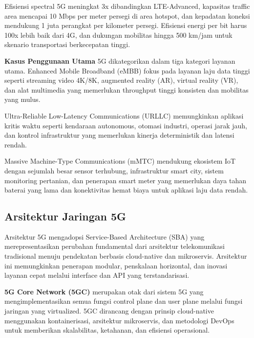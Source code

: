 Efisiensi spectral 5G meningkat 3x dibandingkan LTE-Advanced, kapasitas traffic area mencapai 10 Mbps per meter persegi di area hotspot, dan kepadatan koneksi mendukung 1 juta perangkat per kilometer persegi. Efisiensi energi per bit harus 100x lebih baik dari 4G, dan dukungan mobilitas hingga 500 km/jam untuk skenario transportasi berkecepatan tinggi.

\textbf{Kasus Penggunaan Utama} 5G dikategorikan dalam tiga kategori layanan utama. Enhanced Mobile Broadband (eMBB) fokus pada layanan laju data tinggi seperti streaming video 4K/8K, augmented reality (AR), virtual reality (VR), dan alat multimedia yang memerlukan throughput tinggi konsisten dan mobilitas yang mulus.

Ultra-Reliable Low-Latency Communications (URLLC) memungkinkan aplikasi kritis waktu seperti kendaraan autonomous, otomasi industri, operasi jarak jauh, dan kontrol infrastruktur yang memerlukan kinerja deterministik dan latensi rendah.

Massive Machine-Type Communications (mMTC) mendukung ekosistem IoT dengan sejumlah besar sensor terhubung, infrastruktur smart city, sistem monitoring pertanian, dan penerapan smart meter yang memerlukan daya tahan baterai yang lama dan konektivitas hemat biaya untuk aplikasi laju data rendah.

\subsection{Arsitektur Jaringan 5G}

Arsitektur 5G mengadopsi Service-Based Architecture (SBA) yang merepresentasikan perubahan fundamental dari arsitektur telekomunikasi tradisional menuju pendekatan berbasis cloud-native dan mikroservis. Arsitektur ini memungkinkan penerapan modular, penskalaan horizontal, dan inovasi layanan cepat melalui interface dan API yang terstandarisasi.


\textbf{5G Core Network (5GC)} merupakan otak dari sistem 5G yang mengimplementasikan semua fungsi control plane dan user plane melalui fungsi jaringan yang virtualized. 5GC dirancang dengan prinsip cloud-native menggunakan kontainerisasi, arsitektur mikroservis, dan metodologi DevOps untuk memberikan skalabilitas, ketahanan, dan efisiensi operasional.

